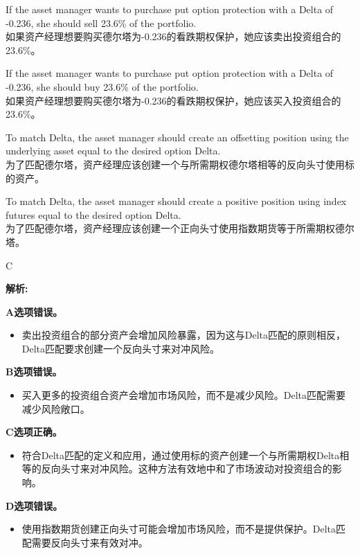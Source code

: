 \documentclass{article}
\newenvironment{explanation}
{\textbf{解析:}\par}
{\par}
\begin{document}
\begin{choices}
    \item If the asset manager wants to purchase put option protection with a Delta of -0.236, she should sell 23.6\% of the portfolio.\\
    如果资产经理想要购买德尔塔为-0.236的看跌期权保护，她应该卖出投资组合的23.6\%。
    \item If the asset manager wants to purchase put option protection with a Delta of -0.236, she should buy 23.6\% of the portfolio.\\
    如果资产经理想要购买德尔塔为-0.236的看跌期权保护，她应该买入投资组合的23.6\%。
    \item To match Delta, the asset manager should create an offsetting position using the underlying asset equal to the desired option Delta.\\
    为了匹配德尔塔，资产经理应该创建一个与所需期权德尔塔相等的反向头寸使用标的资产。
    \item To match Delta, the asset manager should create a positive position using index futures equal to the desired option Delta.\\
    为了匹配德尔塔，资产经理应该创建一个正向头寸使用指数期货等于所需期权德尔塔。
\end{choices}

\begin{correctanswer}
    C
\end{correctanswer}


\begin{explanation}
    \textbf{A选项错误。}
    \begin{itemize}
        \item 卖出投资组合的部分资产会增加风险暴露，因为这与Delta匹配的原则相反，Delta匹配要求创建一个反向头寸来对冲风险。
    \end{itemize}

    \textbf{B选项错误。}
    \begin{itemize}
        \item 买入更多的投资组合资产会增加市场风险，而不是减少风险。Delta匹配需要减少风险敞口。
    \end{itemize}

    \textbf{C选项正确。}
    \begin{itemize}
        \item 符合Delta匹配的定义和应用，通过使用标的资产创建一个与所需期权Delta相等的反向头寸来对冲风险。这种方法有效地中和了市场波动对投资组合的影响。
    \end{itemize}

    \textbf{D选项错误。}
    \begin{itemize}
        \item 使用指数期货创建正向头寸可能会增加市场风险，而不是提供保护。Delta匹配需要反向头寸来有效对冲。
    \end{itemize}
\end{explanation}
\end{document}
